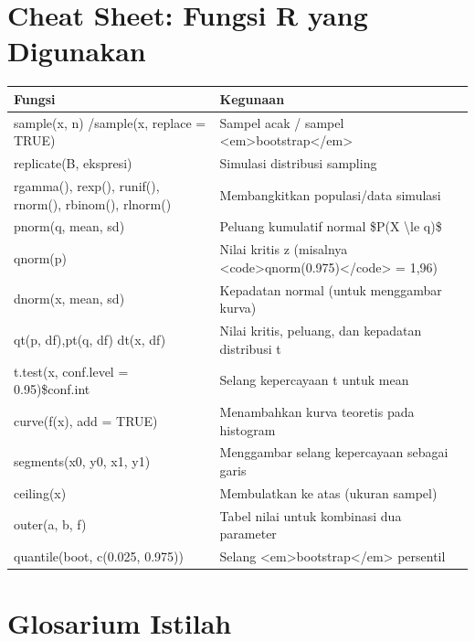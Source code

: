 \documentclass[
  indonesian,
  letterpaper,
]{book}
\begin{document}
\section{Cheat Sheet: Fungsi R yang
Digunakan}\label{cheat-sheet-fungsi-r-yang-digunakan}

\begingroup\fontsize{12}{14}\selectfont

\begin{longtable*}[t]{ll}
\toprule
Fungsi & Kegunaan\\
\midrule
sample(x, n) /sample(x, replace = TRUE) & Sampel acak / sampel <em>bootstrap</em>\\
replicate(B, ekspresi) & Simulasi distribusi sampling\\
rgamma(), rexp(), runif(), rnorm(), rbinom(), rlnorm() & Membangkitkan populasi/data simulasi\\
pnorm(q, mean, sd) & Peluang kumulatif normal \$P(X \textbackslash{}le q)\$\\
qnorm(p) & Nilai kritis z (misalnya <code>qnorm(0.975)</code> = 1,96)\\
\addlinespace
dnorm(x, mean, sd) & Kepadatan normal (untuk menggambar kurva)\\
qt(p, df),pt(q, df) dt(x, df) & Nilai kritis, peluang, dan kepadatan distribusi t\\
t.test(x, conf.level = 0.95)\$conf.int & Selang kepercayaan t untuk mean\\
curve(f(x), add = TRUE) & Menambahkan kurva teoretis pada histogram\\
segments(x0, y0, x1, y1) & Menggambar selang kepercayaan sebagai garis\\
\addlinespace
ceiling(x) & Membulatkan ke atas (ukuran sampel)\\
outer(a, b, f) & Tabel nilai untuk kombinasi dua parameter\\
quantile(boot, c(0.025, 0.975)) & Selang <em>bootstrap</em> persentil\\
\bottomrule
\end{longtable*}
\endgroup{}

\section{Glosarium Istilah}\label{glosarium-istilah}

\begingroup\fontsize{12}{14}\selectfont
\end{document}
